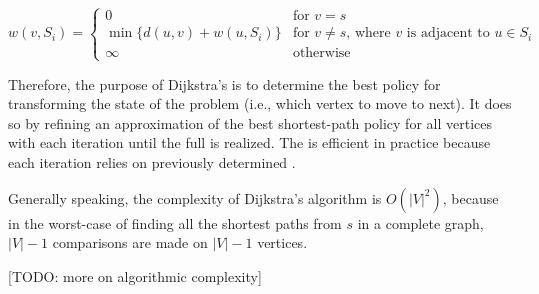\documentclass[12pt]{article}
\begin{document}
$$
w(v,S_i) =
\begin{cases}
0 & \text{for $v = s$} \\
\min\{d(u,v) + w(u, S_i)\} & \text{for $v \neq s$, where $v$ is adjacent to $u \in S_i$} \\
\infty & \text{otherwise}
\end{cases}
$$

Therefore, the purpose of Dijkstra's  is to determine the best policy for transforming the state of the problem (i.e., which vertex to move to next). It does so by refining an approximation of the best shortest-path policy for all vertices with each iteration until the full  is realized. The  is efficient in practice because each iteration relies on previously determined .

Generally speaking, the complexity of Dijkstra's algorithm is $O(|V|^2)$, because in the worst-case  of finding all the shortest paths from $s$ in a complete graph, $|V|-1$ comparisons are made on $|V|-1$ vertices.

[TODO: more on algorithmic complexity]
\end{document}
